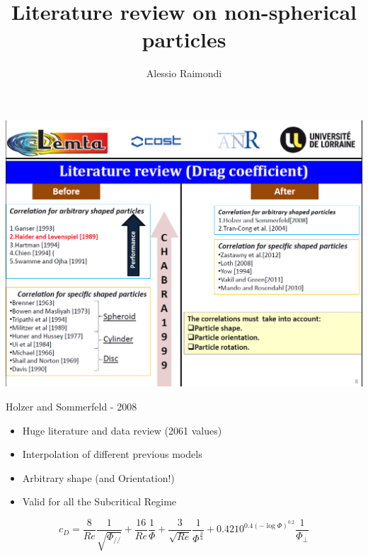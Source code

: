 \documentclass[11pt]{beamer}
\begin{document}
	\author{Alessio Raimondi}
	\title{Literature review on non-spherical particles}
	\begin{frame}[plain]
		\maketitle
	\end{frame}
	
	\begin{frame}
		\centering
		\includegraphics[height=\textheight,width=\textwidth,keepaspectratio]{LiteratureReview.png}		
	\end{frame}

	\begin{frame}{Holzer and Sommerfeld - 2008}
		\begin{itemize}
			\item Huge literature and data review (2061 values)
			\item Interpolation of different previous models
			\item Arbitrary shape (and Orientation!)
			\item Valid for all the Subcritical Regime
		\end{itemize}
	
		\begin{equation*}
			c_D = \frac{8}{Re} \frac{1}{\sqrt{\Phi_{/\!/}}} + \frac{16}{Re} \frac{1}{\Phi} + \frac{3}{\sqrt{Re}} \frac{1}{\Phi^{\frac{3}{4}}} + 0.4210^{0.4(-\log \Phi)^{0.2}} \frac{1}{\Phi_{\perp}}
		\end{equation*}
	\end{frame}
\end{document}

